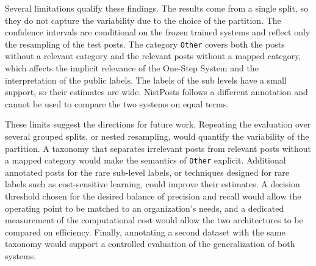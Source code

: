Several limitations qualify these findings. The results come from a single split, so they do not capture the variability due to the choice of the partition. The confidence intervals are conditional on the frozen trained systems and reflect only the resampling of the test posts. The category \texttt{Other} covers both the posts without a relevant category and the relevant posts without a mapped category, which affects the implicit relevance of the One-Step System and the interpretation of the public labels. The labels of the sub levels have a small support, so their estimates are wide. NistPosts follows a different annotation and cannot be used to compare the two systems on equal terms.

These limits suggest the directions for future work. Repeating the evaluation over several grouped splits, or nested resampling, would quantify the variability of the partition. A taxonomy that separates irrelevant posts from relevant posts without a mapped category would make the semantics of \texttt{Other} explicit. Additional annotated posts for the rare sub-level labels, or techniques designed for rare labels such as cost-sensitive learning, could improve their estimates. A decision threshold chosen for the desired balance of precision and recall would allow the operating point to be matched to an organization's needs, and a dedicated measurement of the computational cost would allow the two architectures to be compared on efficiency. Finally, annotating a second dataset with the same taxonomy would support a controlled evaluation of the generalization of both systems.
